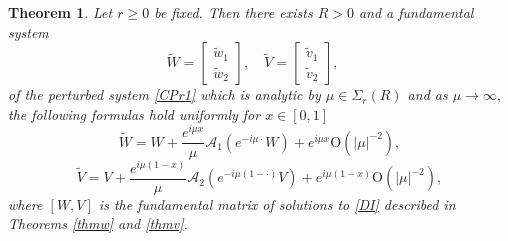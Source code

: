 \documentclass[11pt]{amsart}
\theoremstyle{plain}
\newtheorem{thm}{Theorem}[section]
\theoremstyle{definition}
\theoremstyle{remark}
\numberwithin{equation}{section}
\begin{document}
\begin{thm}\label{T.7.2}
Let $r\geq 0$ be fixed. Then there exists $R>0$ and a fundamental system
\[
\widetilde{W}=\left[\begin{array}{c}
\tilde{w}_1\\
\tilde{w}_2\end{array}\right],\quad
\widetilde{V}=\left[\begin{array}{c}
\tilde{v}_1\\
\tilde{v}_2\end{array}\right],\quad
\]
of the perturbed system \eqref{CPr1} which is analytic by $\mu\in \Sigma_{r}(R)$ and as  $\mu\to\infty,$
the following formulas hold uniformly for $x\in [0,1]$
\[
\widetilde{W}=W+\frac{e^{i\mu x}}{\mu}\mathcal{A}_1(e^{-i\mu \cdot}W)+
e^{i\mu x}\mbox{O}(|\mu|^{-2}),
\]
\[
\widetilde{V}=V+\frac{e^{i\mu(1-x)}}{\mu}\mathcal{A}_2(e^{-i\mu(1-\cdot)}V)+
e^{i\mu(1-x)}\mbox{O}(|\mu|^{-2}),
\]
where $[W,V]$ is the fundamental matrix of solutions to \eqref{DI} described in Theorems \ref{thmw} and \ref{thmv}.
\end{thm}
\end{document}
